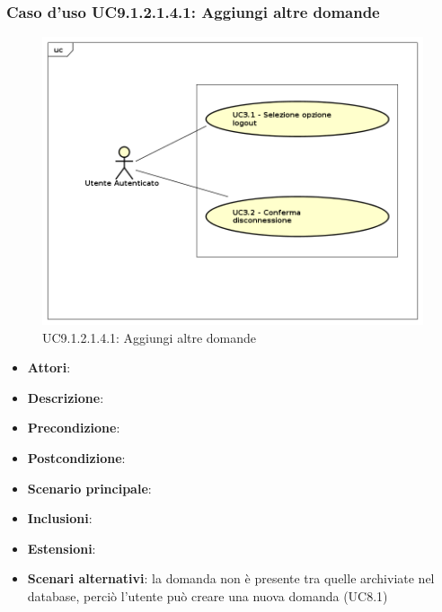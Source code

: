 						\subsubsection{Caso d'uso UC9.1.2.1.4.1: Aggiungi altre domande}
						\label{UC9.1.2.1.4.1}
						\begin{figure}[h]
							\centering
						\includegraphics[scale=0.7,keepaspectratio]{UML/UC9.png}
							\caption{UC9.1.2.1.4.1: Aggiungi altre domande}
						\end{figure}
						\FloatBarrier
						\begin{itemize}
							\item \textbf{Attori}: 
							\item \textbf{Descrizione}: 
							\item \textbf{Precondizione}: 
							\item \textbf{Postcondizione}: 
							\item \textbf{Scenario principale}:
							\item \textbf{Inclusioni}:
							\item \textbf{Estensioni}:
							\item \textbf{Scenari alternativi}: la domanda non è presente tra quelle archiviate nel database, perciò l'utente può creare una nuova domanda (UC8.1)
						\end{itemize}
							
